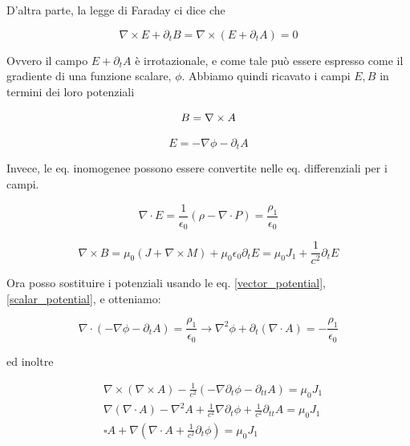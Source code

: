 \documentclass{report}
\begin{document}
D'altra parte, la legge di Faraday ci dice che 

\begin{equation}
    \nabla \times E + \partial_t B = \nabla \times (E + \partial_tA) = 0
\end{equation}

Ovvero il campo $E + \partial_tA$ è irrotazionale, e come tale può essere espresso come il gradiente di una funzione scalare, $\phi$. Abbiamo quindi ricavato i campi $E, B$ in termini dei loro potenziali


\begin{equation}
    \label{vector_potential}
     B = \nabla \times A \\
\end{equation}

\begin{equation}
    \label{scalar_potential}
    E = -\nabla\phi - \partial_tA
\end{equation}

Invece, le eq. inomogenee possono essere convertite nelle eq. differenziali per i campi. 


\begin{equation}
    \nabla \cdot E = \frac{1}{\epsilon_0}(\rho - \nabla \cdot P) = \frac{\rho_1}{\epsilon_0}
\end{equation}

\begin{equation}
    \nabla \times B = \mu_0(J + \nabla \times M) + \mu_0\epsilon_0\partial_tE = \mu_0J_1 + \frac{1}{c^2}\partial_tE
\end{equation}

Ora posso sostituire i potenziali usando le eq. \ref{vector_potential}, \ref{scalar_potential}, e otteniamo:

\begin{equation}
    \nabla \cdot (-\nabla\phi - \partial_tA) = \frac{\rho_1}{\epsilon_0} \rightarrow \nabla^2\phi + \partial_t(\nabla \cdot A) = -\frac{\rho_1}{\epsilon_0}
\end{equation}

ed inoltre 

\begin{align}
    &\nabla \times (\nabla \times A) - \frac{1}{c^2}(-\nabla\partial_t\phi - \partial_{tt}A) = \mu_0 J_1 \\
    &\nabla(\nabla \cdot A) - \nabla^2A + \frac{1}{c^2}\nabla\partial_t\phi +\frac{1}{c^2} \partial_{tt}A = \mu_0 J_1 \\
    & \square A + \nabla(\nabla \cdot A + \frac{1}{c^2}\partial_t\phi) = \mu_0J_1
\end{align}
\end{document}
